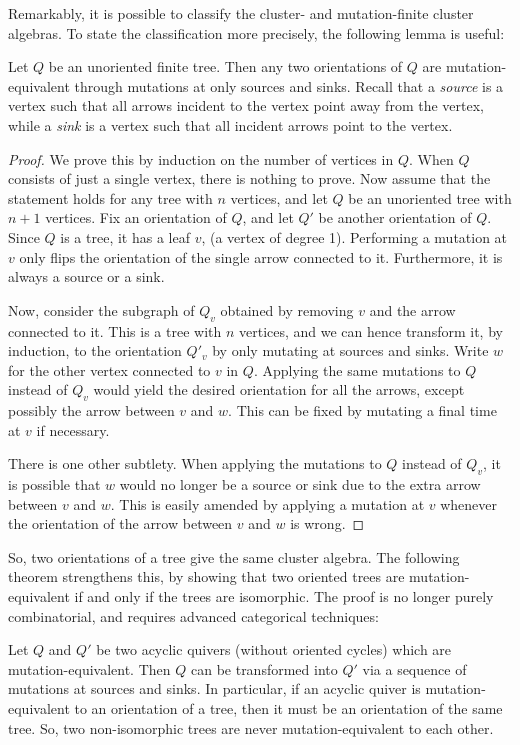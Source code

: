 Remarkably, it is possible to classify the cluster- and mutation-finite cluster
algebras. To state the classification more precisely, the following lemma is useful:
\begin{lemma}\label{lem:orientation_tree_mutation}

	Let $Q$ be an unoriented finite tree. Then any two orientations of $Q$ are
	mutation-equivalent through mutations at only sources and sinks. Recall that a
	\emph{source} is a vertex such that all arrows incident to the vertex
	point away from the vertex, while a \emph{sink} is a vertex such that all
	incident arrows point to the vertex.
\end{lemma}

\begin{proof}
	We prove this by induction on the number of vertices in $Q$. When $Q$ consists of just a single vertex, there is nothing to prove. Now assume that the statement holds for any tree with $n$ vertices, and let $Q$ be an unoriented tree with $n+1$ vertices. Fix an orientation of $Q$, and let $Q'$ be another orientation of $Q$. Since $Q$ is a tree, it has a leaf $v$, (a vertex of degree 1). Performing a mutation at $v$ only flips the orientation of the single arrow connected to it. Furthermore, it is always a source or a sink.

	Now, consider the subgraph of $Q_v$ obtained by removing $v$ and the arrow connected to
	it. This is a tree with $n$ vertices, and we can hence transform it, by induction, to
	the orientation $Q'_v$ by only mutating at sources and sinks. Write $w$ for the other
	vertex connected to $v$ in $Q$. Applying the same mutations to $Q$ instead of $Q_v$
	would yield the desired orientation for all the arrows, except possibly the arrow
	between $v$ and $w$. This can be fixed by mutating a final time at $v$ if necessary.

	There is one other subtlety. When applying the mutations to $Q$ instead of $Q_v$, it is
	possible that $w$ would no longer be a source or sink due to the extra arrow between
	$v$ and $w$. This is easily amended by applying a mutation at $v$ whenever the
	orientation of the arrow between $v$ and $w$ is wrong.
\end{proof}

So, two orientations of a tree give the same cluster algebra. The following theorem
strengthens this, by showing that two oriented trees are mutation-equivalent if and
only if the trees are isomorphic. The proof is no longer purely combinatorial, and
requires advanced categorical techniques:
\begin{theorem}

	Let $Q$ and $Q'$ be two acyclic quivers (without oriented cycles)
	which are mutation-equivalent. Then $Q$ can be transformed into $Q'$ via a sequence of
	mutations at sources and sinks. In particular, if an acyclic quiver is
	mutation-equivalent to an orientation of a tree, then it must be an orientation of the
	same tree. So, two non-isomorphic trees are never mutation-equivalent to each other.
\end{theorem}

